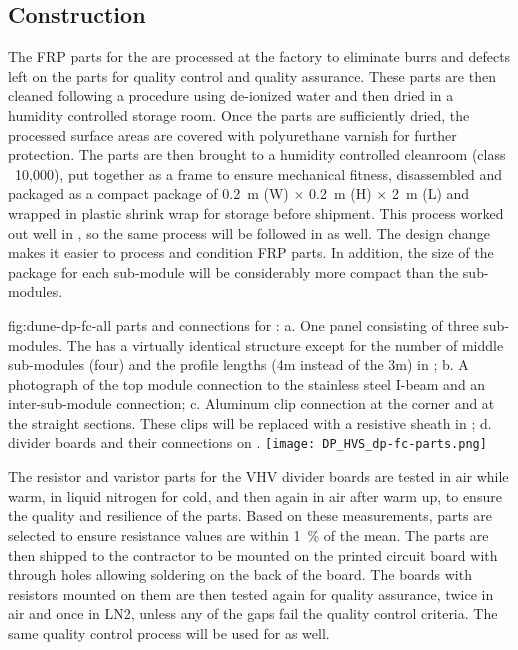 \subsection{Construction}
\label{sec:fddp-hv-protodune-lessons-construction}
The FRP parts for the  are processed at the factory to eliminate burrs and defects left on the parts for quality control and quality assurance.  
These parts are then cleaned following a procedure using de-ionized water and then dried in a humidity controlled storage room.
Once the parts are sufficiently dried, the processed surface areas are covered with polyurethane varnish for further protection.
The parts are then brought to a humidity controlled cleanroom (class ~10,000), put together as a frame to ensure mechanical fitness, disassembled and packaged as a compact package of \SI{0.2}{\m} (W) $\times$ \SI{0.2}{\m} (H) $\times$ \SI{2}{\m} (L) and wrapped in plastic shrink wrap for storage before shipment.
This process worked out well in , so the same process will be followed in  \dual as well.
The design change makes it easier to process and condition FRP parts.
In addition, the size of the package for each sub-module will be considerably more compact than the   sub-modules.

\begin{dunefigure}{fig:dune-dp-fc-all}
{ parts and connections for :  a. One   panel consisting of three sub-modules.  The  has a virtually identical structure except for the number of middle sub-modules (four) and the profile lengths (4m instead of the 3m) in ; b. A photograph of the top module connection to the stainless steel I-beam and an inter-sub-module connection; c. Aluminum clip connection at the corner and at the straight sections.  These clips will be replaced with a resistive sheath in ; d.  divider boards and their connections on  . }
\texttt{[image: DP\_HVS\_dp-fc-parts.png]}
\end{dunefigure}

The resistor and varistor parts for the VHV divider boards are tested in air while warm, in liquid nitrogen for cold, and then again in air after warm up, to ensure the quality and resilience of the parts.  
Based on these measurements, parts are selected to ensure resistance values are within \num{1}~\%  of the mean. 
The parts are then shipped to the contractor to be mounted on the printed circuit board with through holes allowing soldering on the back of the board.
The boards with resistors mounted on them are then tested again for quality assurance, twice in air and once in LN2, unless any of the gaps fail the quality control criteria.
The same quality control process will be used for  \dual as well.

